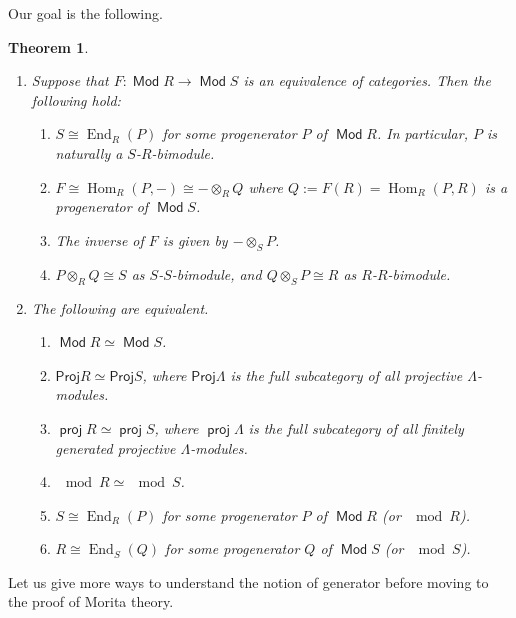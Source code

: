 \documentclass[11pt,a4paper]{article}
\numberwithin{equation}{section}
\theoremstyle{all}
\newtheorem{theorem}{Theorem}[section]
\theoremstyle{remark}
\newcommand{\Hom}{\operatorname{Hom}\nolimits}
\newcommand{\End}{\operatorname{End}\nolimits}
\DeclareMathOperator{\Mod}{\mathsf{Mod}}
\DeclareMathOperator{\proj}{\mathsf{proj}}
\begin{document}
Our goal is the following.
\begin{theorem}\label{thm:Morita}
\begin{enumerate}[\rm(I)]
\item Suppose that $F:\Mod R\to \Mod S$ is an equivalence of categories.
Then the following hold:
\begin{enumerate}
\item $S\cong \End_R(P)$ for some progenerator $P$ of $\Mod R$.  In particular, $P$ is naturally a $S$-$R$-bimodule.

\item $F \cong \Hom_R(P,-)\cong -\otimes_RQ$ where $Q:=F(R)=\Hom_R(P,R)$ is a progenerator of $\Mod S$.

\item The inverse of $F$ is given by $-\otimes_S P$.

\item $P\otimes_R Q\cong S$ as $S$-$S$-bimodule, and $Q\otimes_S P\cong R$ as $R$-$R$-bimodule.
\end{enumerate}

\item The following are equivalent.
\begin{enumerate}[\rm(1)]
\item $\Mod R\simeq \Mod S$.
\item $\mathsf{Proj}R \simeq \mathsf{Proj} S$, where $\mathsf{Proj}\Lambda$ is the full subcategory of all projective $\Lambda$-modules.
\item $\proj R\simeq \proj S$, where $\proj\Lambda$ is the full subcategory of all finitely generated projective $\Lambda$-modules.
\item $\mod R\simeq \mod S$.
\item $S\cong \End_R(P)$ for some progenerator $P$ of $\Mod R$ (or $\mod R$).
\item $R\cong \End_S(Q)$ for some progenerator $Q$ of $\Mod S$ (or $\mod S$).
\end{enumerate}

\end{enumerate}
\end{theorem}


Let us give more ways to understand the notion of generator before moving to the proof of Morita theory.
\end{document}
